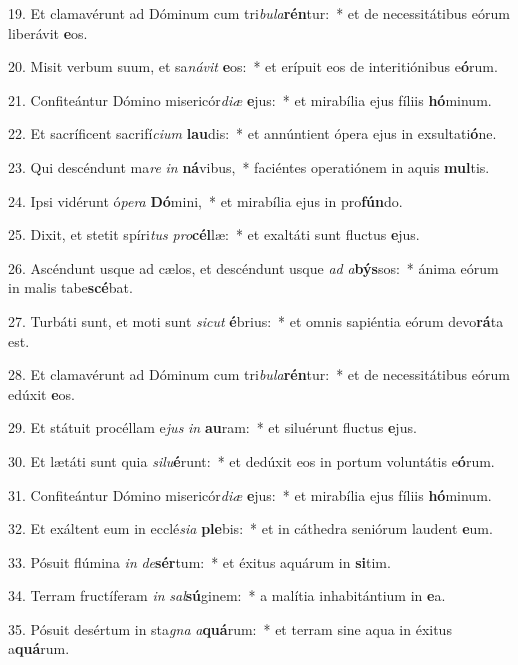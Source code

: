 19. Et clamavérunt ad Dóminum cum tri\textit{bu}\textit{la}\textbf{rén}tur:~*  et de necessitátibus eórum liberávit \textbf{e}os.\

20. Misit verbum suum, et sa\textit{ná}\textit{vit} \textbf{e}os:~*  et erípuit eos de interitiónibus e\textbf{ó}rum.\

21. Confiteántur Dómino misericór\textit{di}\textit{æ} \textbf{e}jus:~*  et mirabília ejus fíliis \textbf{hó}minum.\

22. Et sacríficent sacrifí\textit{ci}\textit{um} \textbf{lau}dis:~*  et annúntient ópera ejus in exsultati\textbf{ó}ne.\

23. Qui descéndunt ma\textit{re} \textit{in} \textbf{ná}vibus,~*  faciéntes operatiónem in aquis \textbf{mul}tis.\

24. Ipsi vidérunt ó\textit{pe}\textit{ra} \textbf{Dó}mini,~*  et mirabília ejus in pro\textbf{fún}do.\

25. Dixit, et stetit spíri\textit{tus} \textit{pro}\textbf{cél}læ:~*  et exaltáti sunt fluctus \textbf{e}jus.\

26. Ascéndunt usque ad cælos, et descéndunt usque \textit{ad} \textit{a}\textbf{býs}sos:~*  ánima eórum in malis tabe\textbf{scé}bat.\

27. Turbáti sunt, et moti sunt \textit{sic}\textit{ut} \textbf{é}brius:~*  et omnis sapiéntia eórum devo\textbf{rá}ta est.\

28. Et clamavérunt ad Dóminum cum tri\textit{bu}\textit{la}\textbf{rén}tur:~*  et de necessitátibus eórum edúxit \textbf{e}os.\

29. Et státuit procéllam e\textit{jus} \textit{in} \textbf{au}ram:~*  et siluérunt fluctus \textbf{e}jus.\

30. Et lætáti sunt quia \textit{si}\textit{lu}\textbf{é}runt:~*  et dedúxit eos in portum voluntátis e\textbf{ó}rum.\

31. Confiteántur Dómino misericór\textit{di}\textit{æ} \textbf{e}jus:~*  et mirabília ejus fíliis \textbf{hó}minum.\

32. Et exáltent eum in ecclé\textit{si}\textit{a} \textbf{ple}bis:~*  et in cáthedra seniórum laudent \textbf{e}um.\

33. Pósuit flúmina \textit{in} \textit{de}\textbf{sér}tum:~*  et éxitus aquárum in \textbf{si}tim.\

34. Terram fructíferam \textit{in} \textit{sal}\textbf{sú}ginem:~*  a malítia inhabitántium in \textbf{e}a.\

35. Pósuit desértum in sta\textit{gna} \textit{a}\textbf{quá}rum:~*  et terram sine aqua in éxitus a\textbf{quá}rum.\


